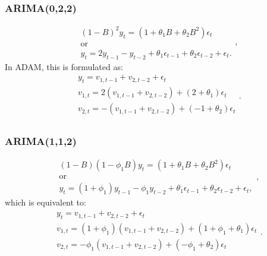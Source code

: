 \documentclass[]{book}
\theoremstyle{definition}
\theoremstyle{definition}
\theoremstyle{definition}
\theoremstyle{definition}
\theoremstyle{remark}
\begin{document}
\hypertarget{arima022}{%
\subsubsection{ARIMA(0,2,2)}\label{arima022}}

\begin{equation*}
    \begin{aligned}
        &(1-B)^2 y_t = (1 + \theta_1 B + \theta_2 B^2) \epsilon_t \\
        &\text{or} \\
        &y_{t} = 2 y_{t-1} - y_{t-2} + \theta_1 \epsilon_{t-1} + \theta_2 \epsilon_{t-2} + \epsilon_t .
    \end{aligned},
\end{equation*}
In ADAM, this is formulated as:
\begin{equation}
  \begin{aligned}
    &{y}_{t} = v_{1,t-1} + v_{2,t-2} + \epsilon_t \\
    &v_{1,t} = 2(v_{1,t-1} + v_{2,t-2}) + (2 + \theta_1) \epsilon_{t} \\
    &v_{2,t} = -(v_{1,t-1} + v_{2,t-2}) + (-1 + \theta_2) \epsilon_{t} \\
  \end{aligned}.
  \label{eq:ADAMARIMAExpanded022}
\end{equation}

\hypertarget{arima112}{%
\subsubsection{ARIMA(1,1,2)}\label{arima112}}

\begin{equation*}
    \begin{aligned}
        &(1-B) (1-\phi_1 B) y_t = (1 + \theta_1 B + \theta_2 B^2) \epsilon_t \\
        &\text{or} \\
        &y_{t} = (1+\phi_1) y_{t-1} - \phi_1 y_{t-2} + \theta_1 \epsilon_{t-1} + \theta_2 \epsilon_{t-2} + \epsilon_t,
    \end{aligned},
\end{equation*}
which is equivalent to:
\begin{equation}
  \begin{aligned}
    &{y}_{t} = v_{1,t-1} + v_{2,t-2} + \epsilon_t \\
    &v_{1,t} = (1+\phi_1)(v_{1,t-1} + v_{2,t-2}) + (1 + \phi_1 + \theta_1) \epsilon_{t} \\
    &v_{2,t} = -\phi_1(v_{1,t-1} + v_{2,t-2}) + (-\phi_1 + \theta_2) \epsilon_{t} \\
  \end{aligned}.
  \label{eq:ADAMARIMAExpanded112}
\end{equation}
\end{document}
